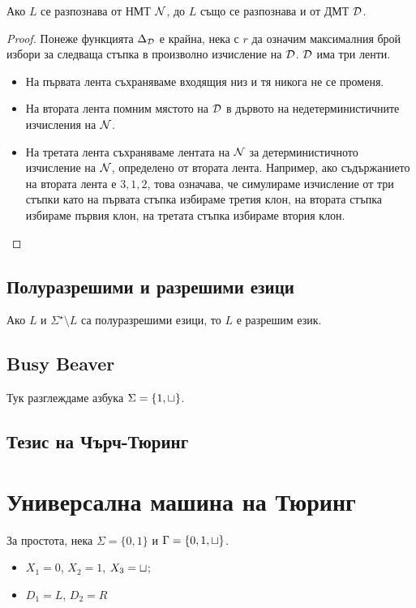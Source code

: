 \begin{thm}
  Ако $L$ се разпознава от НМТ $\mathcal{N}$, до $L$
  също се разпознава и от ДМТ $\mathcal{D}$.
\end{thm}
\begin{proof}
  Понеже функцията $\Delta_{\mathcal{D}}$ е крайна, нека с $r$ да означим 
  максималния брой избори за следваща стъпка в произволно изчисление на $\mathcal{D}$.
  $\mathcal{D}$ има три ленти.
  \begin{itemize}
  \item 
    На първата лента съхраняваме входящия низ и тя никога не се променя.
  \item
    На втората лента помним мястото на $\mathcal{D}$ в дървото на недетерминистичните изчисления на $\mathcal{N}$.  
  \item
    На третата лента съхраняваме лентата на $\mathcal{N}$ за детерминистичното изчисление на $\mathcal{N}$, 
    определено от втората лента. Например, ако съдържанието на втората лента е $3,1,2$,
    това означава, че симулираме изчисление от три стъпки като на първата стъпка избираме третия 
    клон, на втората стъпка избираме първия клон, на третата стъпка избираме втория клон.
  \end{itemize}
\end{proof}


\subsection*{Полуразрешими и разрешими езици}

\begin{thm}
  Ако $L$ и $\Sigma^\star \setminus L$ са полуразрешими езици, то $L$ е разрешим език.
\end{thm}

\subsection*{Busy Beaver}

Тук разглеждаме азбука $\Sigma = \{1,\sqcup\}$.


\subsection*{Тезис на Чърч-Тюринг}

\section{Универсална машина на Тюринг}
За простота, нека $\Sigma = \{0,1\}$ и $\Gamma = \{0,1,\sqcup\}$.
\begin{itemize}
\item 
  $X_1 = 0$, $X_2 = 1$, $X_3 = \sqcup$;
\item
  $D_1 = L$, $D_2 = R$
\end{itemize}

